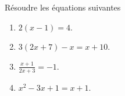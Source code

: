 
\begin{exercice}\label{exoPremiere-0019}

    Résoudre les équations suivantes
    \begin{multicols}{2}
        \begin{enumerate}
            \item
                \( 2(x-1)=4\).
            \item
                \( 3(2x+7)-x=x+10\).
            \item
                \( \frac{ x+1 }{ 2x+3 }=-1\).
            \item
                \( x^2-3x+1=x+1\).
        \end{enumerate}
    \end{multicols}

\end{exercice}
